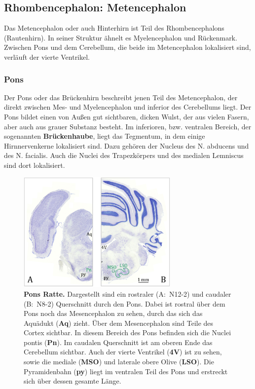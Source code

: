 \documentclass[12pt,a4paper,pdftex]{article}
\begin{document}
\subsection{Rhombencephalon: Metencephalon}
\label{subsec:Metencephalon} 

Das Metencephalon oder auch Hinterhirn ist Teil des Rhombencephalons (Rautenhirn). In seiner Struktur ähnelt es Myelencephalon und Rückenmark. Zwischen Pons und dem Cerebellum, die beide im Metencephalon lokalisiert sind, verläuft der vierte Ventrikel.


\subsubsection{Pons}
\label{subsubsec:Pons} 

Der Pons oder das Brückenhirn beschreibt jenen Teil des Metencephalon, der direkt zwischen Mes- und Myelencephalon und inferior des Cerebellums liegt. Der Pons bildet einen von Außen gut sichtbaren, dicken Wulst, der aus vielen Fasern, aber auch aus grauer Substanz besteht. Im inferioren, bzw. ventralen Bereich, der sogenannten \textbf{Brückenhaube}, liegt das Tegmentum, in dem einige Hirnnervenkerne lokalisiert sind. Dazu gehören der Nucleus des N. abducens und des N. facialis. Auch die Nuclei des Trapezkörpers und des medialen Lemniscus sind dort lokalisiert.

\begin{figure}[H]
    \centering
    \includegraphics[width=0.7\textwidth]{pictures/Bilder_Jule/Ratte/pons.png}
    \caption[Pons Ratte]{\textbf{Pons Ratte.} Dargestellt sind ein rostraler (A:~N12-2) und caudaler (B:~N8-2) Querschnitt durch den Pons. Dabei ist rostral über dem Pons noch das Mesencephalon zu sehen, durch das sich das Aquädukt (\textbf{Aq}) zieht. Über dem Mesencephalon sind Teile des Cortex sichtbar. In diesem Bereich des Pons befinden sich die Nuclei pontis (\textbf{Pn}). Im caudalen Querschnitt ist am oberen Ende das Cerebellum sichtbar. Auch der vierte Ventrikel (\textbf{4V}) ist zu sehen, sowie die mediale (\textbf{MSO}) und laterale obere Olive (\textbf{LSO}). Die Pyramidenbahn (\textbf{py}) liegt im ventralen Teil des Pons und erstreckt sich über dessen gesamte Länge.}
    \label{fig:pons_ratte}
\end{figure}{}
\end{document}
